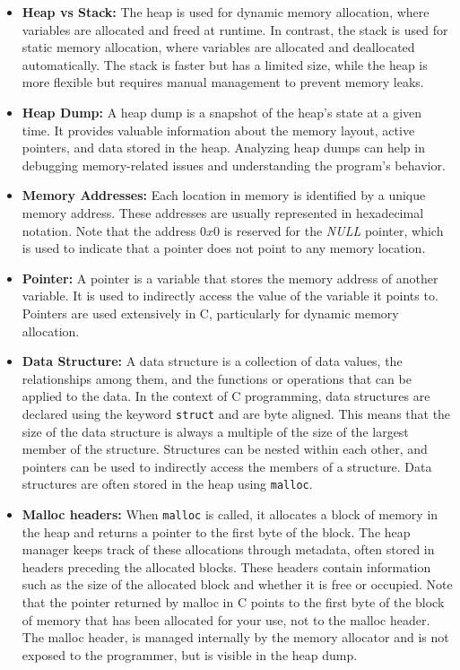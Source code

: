     \begin{itemize}
        \item \textbf{Heap vs Stack:} The heap is used for dynamic memory allocation, where variables are allocated and freed at runtime. In contrast, the stack is used for static memory allocation, where variables are allocated and deallocated automatically. The stack is faster but has a limited size, while the heap is more flexible but requires manual management to prevent memory leaks.
        
        \item \textbf{Heap Dump:} A heap dump is a snapshot of the heap's state at a given time. It provides valuable information about the memory layout, active pointers, and data stored in the heap. Analyzing heap dumps can help in debugging memory-related issues and understanding the program's behavior.
        
        \item \textbf{Memory Addresses:} Each location in memory is identified by a unique memory address. These addresses are usually represented in hexadecimal notation. Note that the address $0x0$ is reserved for the \textit{NULL} pointer, which is used to indicate that a pointer does not point to any memory location.

        \item \textbf{Pointer:} A pointer is a variable that stores the memory address of another variable. It is used to indirectly access the value of the variable it points to. Pointers are used extensively in C, particularly for dynamic memory allocation.
        
        \item \textbf{Data Structure:} A data structure is a collection of data values, the relationships among them, and the functions or operations that can be applied to the data. In the context of C programming, data structures are declared using the keyword \texttt{struct} and are byte aligned. This means that the size of the data structure is always a multiple of the size of the largest member of the structure. Structures can be nested within each other, and pointers can be used to indirectly access the members of a structure. Data structures are often stored in the heap using \texttt{malloc}.
        
        \item \textbf{Malloc headers:} When \texttt{malloc} is called, it allocates a block of memory in the heap and returns a pointer to the first byte of the block. The heap manager keeps track of these allocations through metadata, often stored in headers preceding the allocated blocks. These headers contain information such as the size of the allocated block and whether it is free or occupied. Note that the pointer returned by malloc in C points to the first byte of the block of memory that has been allocated for your use, not to the malloc header. The malloc header, is managed internally by the memory allocator and is not exposed to the programmer, but is visible in the heap dump.
        
    \end{itemize}


